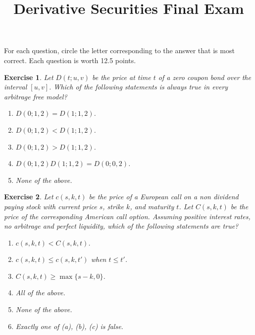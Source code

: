 \documentclass[11pt,fleqn]{amsproc}
\newtheorem{xca}{Exercise}
\begin{document}
\title{Derivative Securities Final Exam}

\maketitle

For each question, circle the letter corresponding to the answer that
is most correct. Each question is worth 12.5 points.

\begin{xca}
Let $D(t;u,v)$ be the price at time $t$ of a zero coupon bond
over the interval $[u, v]$. Which of the following statements
is always true in every arbitrage free model?
\begin{enumerate}
\item $D(0;1,2) = D(1;1,2)$.
\item $D(0;1,2) < D(1;1,2)$.
\item $D(0;1,2) > D(1;1,2)$.
\item $D(0;1,2) D(1;1,2) = D(0;0,2)$.
\item None of the above.
\end{enumerate}

\end{xca}

\begin{xca}
Let $c(s,k,t)$ be the price of a European call on a non dividend paying
stock with current price $s$, strike $k$, and maturity $t$. Let $C(s,k,t)$
be the price of the corresponding American call option. Assuming positive
interest rates, no arbitrage and perfect liquidity, which of the following
statements are true?

\begin{enumerate}
\item $c(s,k,t) < C(s,k,t)$.
\item $c(s,k,t) \le c(s,k,t')$ when $t \le t'$.
\item $C(s,k,t) \ge \max\{s - k, 0\}$.
\item All of the above.
\item None of the above.
\item Exactly one of (a), (b), (c) is false.
\end{enumerate}

\end{xca}
\end{document}
